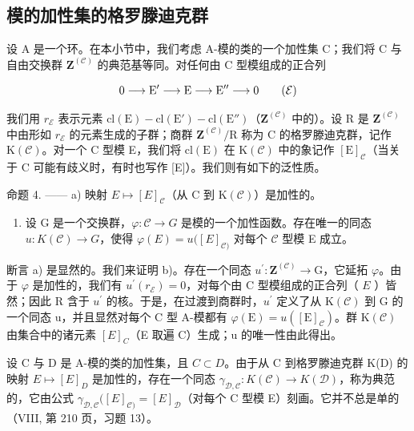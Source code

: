 \subsection{模的加性集的格罗滕迪克群}

设 A 是一个环。在本小节中，我们考虑 A-模的类的一个加性集 C；我们将 C 与自由交换群 \(\mathbf{Z}^{(\mathcal{C})}\) 的典范基等同。对任何由 C 型模组成的正合列

\[
0 \longrightarrow \mathrm{E} ^ {\prime} \longrightarrow \mathrm{E} \longrightarrow \mathrm{E} ^ {\prime \prime} \longrightarrow 0\tag{\( \mathcal{E} \)}
\]

我们用 \(r_{\mathcal{E}}\) 表示元素 \(\mathrm{cl}(\mathrm{E}) - \mathrm{cl}(\mathrm{E}') - \mathrm{cl}(\mathrm{E}'')\)（\(\mathbf{Z}^{(\mathcal{C})}\) 中的）。设 R 是 \(\mathbf{Z}^{(\mathcal{C})}\) 中由形如 \(r_{\mathcal{E}}\) 的元素生成的子群；商群 \(\mathbf{Z}^{(\mathcal{C})}/\mathrm{R}\) 称为 C 的格罗滕迪克群，记作 \(\mathrm{K}(\mathcal{C})\)。对一个 C 型模 E，我们将 \(\mathrm{cl}(\mathrm{E})\) 在 \(\mathrm{K}(\mathcal{C})\) 中的象记作 \([\mathrm{E}]_{\mathcal{C}}\)（当关于 C 可能有歧义时，有时也写作 {[}E{]}）。我们则有如下的泛性质。

命题 4. —— a) 映射 \(E \mapsto [E]_{\mathcal{C}}\)（从 C 到 \(\mathrm{K}(\mathcal{C})\)）是加性的。

\begin{enumerate}
\def\labelenumi{\alph{enumi})}
\setcounter{enumi}{1}
\tightlist
\item
  设 G 是一个交换群，\(\varphi : \mathcal{C} \to G\) 是模的一个加性函数。存在唯一的同态 \(u: K(\mathcal{C}) \to G\)，使得 \(\varphi(E) = u([E]_{\mathcal{C})}\) 对每个 \(\mathcal{C}\) 型模 E 成立。
\end{enumerate}

断言 a) 是显然的。我们来证明 b)。存在一个同态 \(u^{\prime}: \mathbf{Z}^{(\mathcal{C})} \to \mathrm{G}\)，它延拓 \(\varphi\)。由于 \(\varphi\) 是加性的，我们有 \(u^{\prime}(r_{\mathcal{E}}) = 0\)，对每个由 C 型模组成的正合列（ \(E\) ）皆然；因此 R 含于 \(u^{\prime}\) 的核。于是，在过渡到商群时，\(u^{\prime}\) 定义了从 \(\mathrm{K}(\mathcal{C})\) 到 G 的一个同态 u，并且显然对每个 C 型 A-模都有 \(\varphi(\mathrm{E}) = u([\mathrm{E}]_{\mathcal{C}})\)。群 \(\mathrm{K}(\mathcal{C})\) 由集合中的诸元素 \([E]_{C}\)（E 取遍 C）生成；u 的唯一性由此得出。

设 C 与 D 是 A-模的类的加性集，且 \(C \subset D\)。由于从 C 到格罗滕迪克群 K(D) 的映射 \(E \mapsto [E]_{D}\) 是加性的，存在一个同态 \(\gamma_{\mathcal{D},\mathcal{C}} : K(\mathcal{C}) \to K(\mathcal{D})\)，称为典范的，它由公式 \(\gamma_{\mathcal{D},\mathcal{C}}([E]_{\mathcal{C})} = [E]_{\mathcal{D}}\)（对每个 C 型模 E）刻画。它并不总是单的（VIII, 第 210 页，习题 13）。

